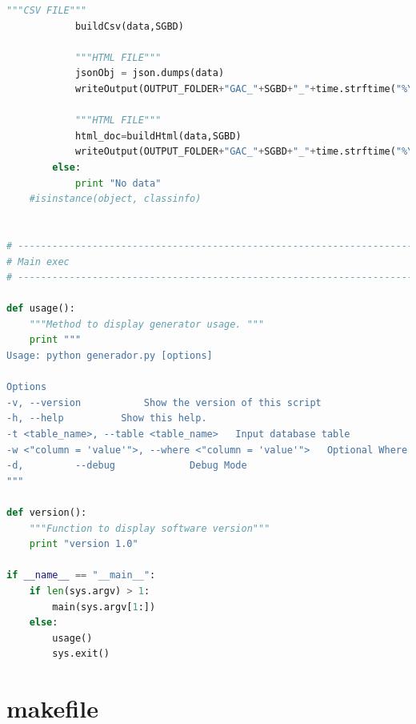 \documentclass[a4paper,11pt]{book}
\begin{document}
\begin{lstlisting}[language=python,caption={generatorP2.py }]
            """CSV FILE"""
            buildCsv(data,SGBD)

            """HTML FILE"""
            jsonObj = json.dumps(data)
            writeOutput(OUTPUT_FOLDER+"GAC_"+SGBD+"_"+time.strftime("%Y%m%d_%H%M%S")+".json",jsonObj)

            """HTML FILE"""
            html_doc=buildHtml(data,SGBD)
            writeOutput(OUTPUT_FOLDER+"GAC_"+SGBD+"_"+time.strftime("%Y%m%d_%H%M%S")+".html",html_doc)
        else:
            print "No data"
    #isinstance(object, classinfo)


# --------------------------------------------------------------------------------------------------
# Main exec
# --------------------------------------------------------------------------------------------------

def usage():
    """Method to display generator usage. """
    print """
Usage: python generador.py [options]

Options
-v, --version			Show the version of this script
-h, --help			Show this help.
-t <table_name>, --table <table_name>   Input database table
-w <"column = 'value'">, --where <"column = 'value'">   Optional Where Clause
-d,         --debug         	Debug Mode
"""

def version():
    """Function to display software version"""
    print "version 1.0"

if __name__ == "__main__":
    if len(sys.argv) > 1:
        main(sys.argv[1:])
    else:
        usage()
        sys.exit()

\end{lstlisting}

\section{makefile}
\begin{lstlisting}[language=python,caption={makefile }]


\end{lstlisting}



%
%
%
%

%
%

\thispagestyle{empty}
\end{document}
